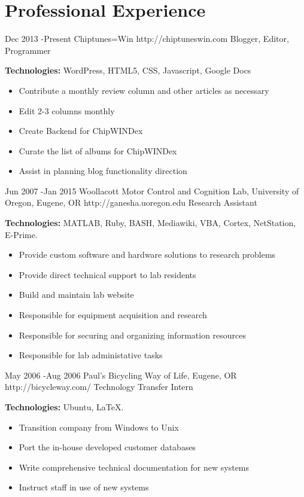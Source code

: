 \documentclass[10pt]{article} %
\begin{document}
\section{Professional Experience}

\job
{Dec 2013 -}{Present}
{Chiptunes=Win}
{http://chiptuneswin.com}
{Blogger, Editor, Programmer}
{\rule{0mm}{5mm}\textbf{Technologies:} WordPress, HTML5, CSS, Javascript, Google Docs

\begin{itemize}
\setlength\itemsep{0.12em}
\item{Contribute a monthly review column and other articles as necessary}
\item{Edit 2-3 columns monthly}
\item{Create Backend for ChipWINDex }
\item{Curate the list of albums for ChipWINDex}
\item{Assist in planning blog functionality direction}
\end{itemize}

}

\job
{Jun 2007 -}{Jan 2015}
{Woollacott Motor Control and Cognition Lab, University of Oregon, Eugene, OR}
{http://ganesha.uoregon.edu}
{Research Assistant}
{\rule{0mm}{5mm}\textbf{Technologies:} MATLAB, Ruby, BASH, Mediawiki, VBA, Cortex, NetStation, E-Prime.

\begin{itemize}
\setlength\itemsep{0.12em}
\item{Provide custom software and hardware solutions to research problems}
\item{Provide direct technical support to lab residents}
\item{Build and maintain lab website}
\item{Responsible for equipment acquisition and research}
\item{Responsible for securing and organizing information resources}
\item{Responsible for lab administative tasks}
\end{itemize}

}


\job
{May 2006 -}{Aug 2006}
{Paul's Bicycling Way of Life, Eugene, OR}
{http://bicycleway.com/}
{Technology Transfer Intern}
{\rule{0mm}{5mm}\textbf{Technologies:} Ubuntu, LaTeX.

\begin{itemize}
\setlength\itemsep{0.12em}
\item{Transition company from Windows to Unix}
\item{Port the in-house developed customer databases}
\item{Write comprehensive technical documentation for new systems}
\item{Instruct staff in use of new systems}
\end{itemize}

}
\end{document}
